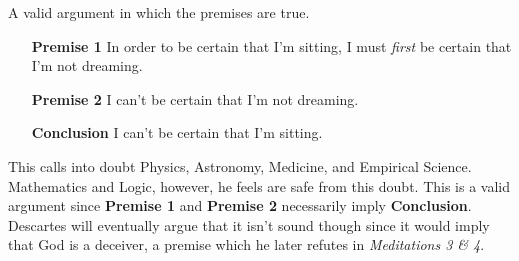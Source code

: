 \begin{definition}
A valid argument in which the premises are true.
\end{definition}

\begin{enumerate}
\item[\textbf{Premise 1}]\label{des:p1} In order to be certain that I'm sitting, I must \emph{first} be certain that I'm not dreaming.
\item[\textbf{Premise 2}]\label{des:p2} I can't be certain that I'm not dreaming.
\item[\textbf{Conclusion}]\label{des:conc} I can't be certain that I'm sitting.
\end{enumerate}

This calls into doubt Physics, Astronomy, Medicine, and Empirical Science. Mathematics and Logic, however, he feels are safe from this doubt. This is a valid argument since \textbf{Premise 1} and \textbf{Premise 2} necessarily imply \textbf{Conclusion}. Descartes will eventually argue that it isn't sound though since it would imply that God is a deceiver, a premise which he later refutes in \emph{Meditations 3 \& 4}.